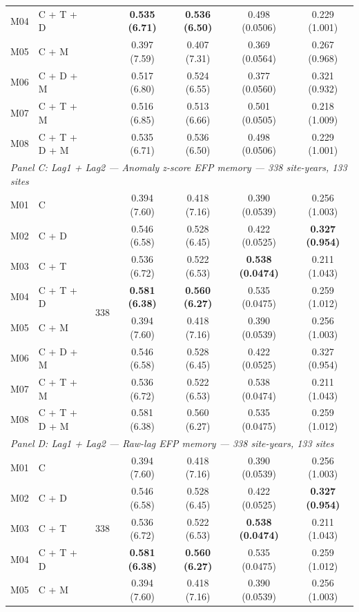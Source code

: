 \begin{table}[htbp]
\begin{tabular}{llccccc}
M04 & C + T + D &  & \textbf{0.535 (6.71)} & \textbf{0.536 (6.50)} & 0.498 (0.0506) & 0.229 (1.001) \\
M05 & C + M &  & 0.397 (7.59) & 0.407 (7.31) & 0.369 (0.0564) & 0.267 (0.968) \\
M06 & C + D + M &  & 0.517 (6.80) & 0.524 (6.55) & 0.377 (0.0560) & 0.321 (0.932) \\
M07 & C + T + M &  & 0.516 (6.85) & 0.513 (6.66) & 0.501 (0.0505) & 0.218 (1.009) \\
M08 & C + T + D + M &  & 0.535 (6.71) & 0.536 (6.50) & 0.498 (0.0506) & 0.229 (1.001) \\
\midrule
\multicolumn{7}{l}{\textit{Panel C: Lag1 + Lag2 --- Anomaly z-score EFP memory --- 338 site-years, 133 sites}} \\
\midrule
M01 & C & \multirow{8}{*}{338} & 0.394 (7.60) & 0.418 (7.16) & 0.390 (0.0539) & 0.256 (1.003) \\
M02 & C + D &  & 0.546 (6.58) & 0.528 (6.45) & 0.422 (0.0525) & \textbf{0.327 (0.954)} \\
M03 & C + T &  & 0.536 (6.72) & 0.522 (6.53) & \textbf{0.538 (0.0474)} & 0.211 (1.043) \\
M04 & C + T + D &  & \textbf{0.581 (6.38)} & \textbf{0.560 (6.27)} & 0.535 (0.0475) & 0.259 (1.012) \\
M05 & C + M &  & 0.394 (7.60) & 0.418 (7.16) & 0.390 (0.0539) & 0.256 (1.003) \\
M06 & C + D + M &  & 0.546 (6.58) & 0.528 (6.45) & 0.422 (0.0525) & 0.327 (0.954) \\
M07 & C + T + M &  & 0.536 (6.72) & 0.522 (6.53) & 0.538 (0.0474) & 0.211 (1.043) \\
M08 & C + T + D + M &  & 0.581 (6.38) & 0.560 (6.27) & 0.535 (0.0475) & 0.259 (1.012) \\
\midrule
\multicolumn{7}{l}{\textit{Panel D: Lag1 + Lag2 --- Raw-lag EFP memory --- 338 site-years, 133 sites}} \\
\midrule
M01 & C & \multirow{8}{*}{338} & 0.394 (7.60) & 0.418 (7.16) & 0.390 (0.0539) & 0.256 (1.003) \\
M02 & C + D &  & 0.546 (6.58) & 0.528 (6.45) & 0.422 (0.0525) & \textbf{0.327 (0.954)} \\
M03 & C + T &  & 0.536 (6.72) & 0.522 (6.53) & \textbf{0.538 (0.0474)} & 0.211 (1.043) \\
M04 & C + T + D &  & \textbf{0.581 (6.38)} & \textbf{0.560 (6.27)} & 0.535 (0.0475) & 0.259 (1.012) \\
M05 & C + M &  & 0.394 (7.60) & 0.418 (7.16) & 0.390 (0.0539) & 0.256 (1.003) \\

\end{tabular}
\end{table}
